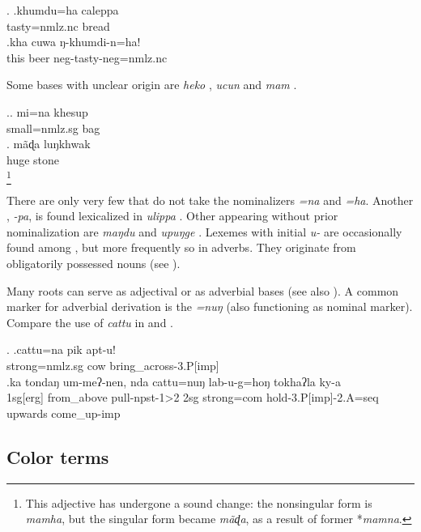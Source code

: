 \ex. \ag.khumdu=ha caleppa\\
tasty{\sc =nmlz.nc} bread\\
\bg.kha cuwa ŋ-khumdi-n=ha!\\
this beer {\sc neg-}tasty{\sc -neg=nmlz.nc}\\

  
Some bases with  unclear origin are \emph{heko} , \emph{ucun}  and \emph{mam} .

\ex.\ag. mi=na khesup\\
small{\sc =nmlz.sg} bag\\
\bg. mãɖa luŋkhwak\\
	huge{\sc [nmlz.sg]} stone\\
	\footnote{This adjective has undergone a sound change: the nonsingular form is \emph{mamha}, but the singular form became \emph{mãɖa}, as a result of former *\emph{mamna}.}

	
There are only very few  that do not take the nominalizers \emph{=na} and \emph{=ha}. Another , \emph{-pa}, is found lexicalized in \emph{ulippa} . Other  appearing without prior nominalization are \emph{maŋdu}  and \emph{upuŋge} . Lexemes with initial \emph{u-} are occasionally found among , but more frequently so in adverbs. They originate from obligatorily possessed nouns (see ).


	Many roots can serve as adjectival or as adverbial bases (see also  ). A common marker for adverbial derivation is the  \emph{=nuŋ} (also functioning as nominal  marker). Compare the use of \emph{cattu} in \Next[a] and \Next[b].
	
	\ex. \ag.cattu=na pik apt-u!\\
	strong{\sc =nmlz.sg} cow bring\_across{\sc -3.P[imp]}\\
	\bg.ka       tondaŋ    um-meʔ-nen,       nda cattu=nuŋ    lab-u-g=hoŋ                tokhaʔla ky-a\\
	{\sc 1sg[erg]} from\_above pull{\sc -npst-1>2} {\sc 2sg} strong{\sc =com} hold{\sc -3.P[imp]-2.A=seq} upwards come\_up{\sc -imp}\\
	 

	
\subsection{Color terms}\label{sec-color}


